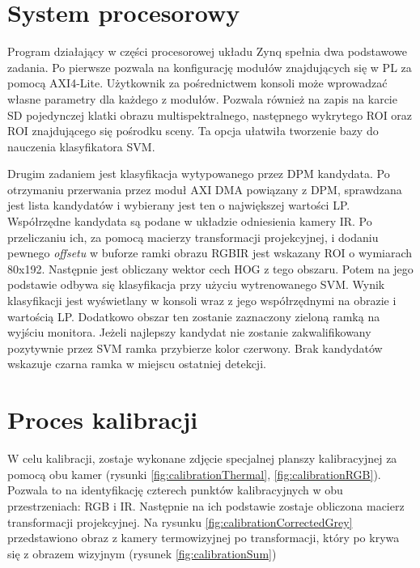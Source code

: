 \section{System procesorowy}
Program działający w części procesorowej układu Zynq spełnia dwa podstawowe zadania. Po pierwsze pozwala na konfigurację modułów znajdujących się w PL za pomocą AXI4-Lite. Użytkownik za pośrednictwem konsoli może wprowadzać własne parametry dla każdego z modułów. Pozwala również na zapis na karcie SD pojedynczej klatki obrazu multispektralnego, następnego wykrytego ROI oraz ROI znajdującego się pośrodku sceny. Ta opcja ułatwiła tworzenie bazy do nauczenia klasyfikatora SVM. 

Drugim zadaniem jest klasyfikacja wytypowanego przez DPM kandydata. Po otrzymaniu przerwania przez moduł AXI DMA powiązany z DPM, sprawdzana jest lista kandydatów i wybierany jest ten o największej wartości LP. Współrzędne kandydata są podane w układzie odniesienia kamery IR. Po przeliczaniu ich, za pomocą macierzy transformacji projekcyjnej, i dodaniu pewnego \textit{offsetu} w buforze ramki obrazu RGBIR jest wskazany ROI o wymiarach 80x192. Następnie jest obliczany wektor cech HOG z tego obszaru. Potem na jego podstawie odbywa się klasyfikacja przy użyciu wytrenowanego SVM. Wynik klasyfikacji jest wyświetlany w konsoli wraz z jego współrzędnymi na obrazie i wartością LP. Dodatkowo obszar ten zostanie zaznaczony zieloną ramką na wyjściu monitora. Jeżeli najlepszy kandydat nie zostanie zakwalifikowany pozytywnie przez SVM ramka przybierze kolor czerwony. Brak kandydatów wskazuje czarna ramka w miejscu ostatniej detekcji. 
\section{Proces kalibracji}
W celu kalibracji, zostaje wykonane zdjęcie specjalnej planszy kalibracyjnej za pomocą obu kamer (rysunki \ref{fig:calibrationThermal}, \ref{fig:calibrationRGB}). Pozwala to na identyfikację czterech punktów kalibracyjnych w obu przestrzeniach: RGB i IR. Następnie na ich podstawie zostaje obliczona macierz transformacji projekcyjnej. Na rysunku \ref{fig:calibrationCorrectedGrey} przedstawiono obraz z kamery termowizyjnej po transformacji, który po krywa się z obrazem wizyjnym (rysunek \ref{fig:calibrationSum})

